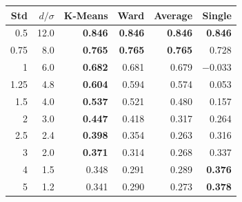 \begin{tabular}{rrrrrr}
\toprule
\textbf{Std} & \textbf{$d/\sigma$} & \textbf{K-Means} & \textbf{Ward} & \textbf{Average} & \textbf{Single} \\
\midrule
0.5 & 12.0 & \textbf{0.846} & \textbf{0.846} & \textbf{0.846} & \textbf{0.846} \\
0.75 & 8.0 & \textbf{0.765} & \textbf{0.765} & \textbf{0.765} & 0.728 \\
1 & 6.0 & \textbf{0.682} & 0.681 & 0.679 & $-$0.033 \\
1.25 & 4.8 & \textbf{0.604} & 0.594 & 0.574 & 0.053 \\
1.5 & 4.0 & \textbf{0.537} & 0.521 & 0.480 & 0.157 \\
2 & 3.0 & \textbf{0.447} & 0.418 & 0.317 & 0.264 \\
2.5 & 2.4 & \textbf{0.398} & 0.354 & 0.263 & 0.316 \\
3 & 2.0 & \textbf{0.371} & 0.314 & 0.268 & 0.337 \\
4 & 1.5 & 0.348 & 0.291 & 0.289 & \textbf{0.376} \\
5 & 1.2 & 0.341 & 0.290 & 0.273 & \textbf{0.378} \\
\bottomrule
\end{tabular}

